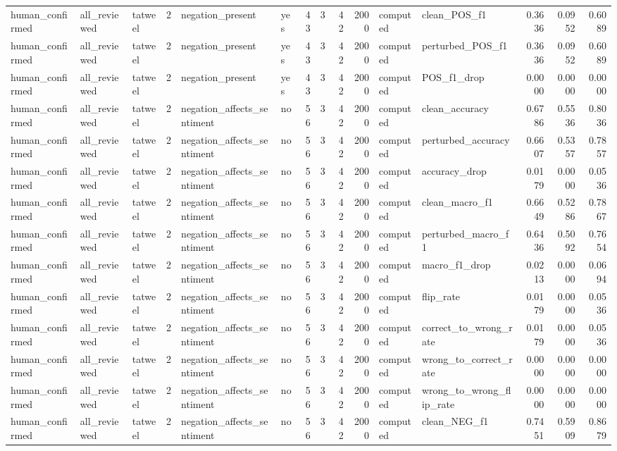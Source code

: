 \begin{tabular}{lllrllrrrrllrrr}
human_confirmed & all_reviewed & tatweel & 2 & negation_present & yes & 43 & 3 & 42 & 2000 & computed & clean_POS_f1 & 0.3636 & 0.0952 & 0.6089 \\
human_confirmed & all_reviewed & tatweel & 2 & negation_present & yes & 43 & 3 & 42 & 2000 & computed & perturbed_POS_f1 & 0.3636 & 0.0952 & 0.6089 \\
human_confirmed & all_reviewed & tatweel & 2 & negation_present & yes & 43 & 3 & 42 & 2000 & computed & POS_f1_drop & 0.0000 & 0.0000 & 0.0000 \\
human_confirmed & all_reviewed & tatweel & 2 & negation_affects_sentiment & no & 56 & 3 & 42 & 2000 & computed & clean_accuracy & 0.6786 & 0.5536 & 0.8036 \\
human_confirmed & all_reviewed & tatweel & 2 & negation_affects_sentiment & no & 56 & 3 & 42 & 2000 & computed & perturbed_accuracy & 0.6607 & 0.5357 & 0.7857 \\
human_confirmed & all_reviewed & tatweel & 2 & negation_affects_sentiment & no & 56 & 3 & 42 & 2000 & computed & accuracy_drop & 0.0179 & 0.0000 & 0.0536 \\
human_confirmed & all_reviewed & tatweel & 2 & negation_affects_sentiment & no & 56 & 3 & 42 & 2000 & computed & clean_macro_f1 & 0.6649 & 0.5286 & 0.7867 \\
human_confirmed & all_reviewed & tatweel & 2 & negation_affects_sentiment & no & 56 & 3 & 42 & 2000 & computed & perturbed_macro_f1 & 0.6436 & 0.5092 & 0.7654 \\
human_confirmed & all_reviewed & tatweel & 2 & negation_affects_sentiment & no & 56 & 3 & 42 & 2000 & computed & macro_f1_drop & 0.0213 & 0.0000 & 0.0694 \\
human_confirmed & all_reviewed & tatweel & 2 & negation_affects_sentiment & no & 56 & 3 & 42 & 2000 & computed & flip_rate & 0.0179 & 0.0000 & 0.0536 \\
human_confirmed & all_reviewed & tatweel & 2 & negation_affects_sentiment & no & 56 & 3 & 42 & 2000 & computed & correct_to_wrong_rate & 0.0179 & 0.0000 & 0.0536 \\
human_confirmed & all_reviewed & tatweel & 2 & negation_affects_sentiment & no & 56 & 3 & 42 & 2000 & computed & wrong_to_correct_rate & 0.0000 & 0.0000 & 0.0000 \\
human_confirmed & all_reviewed & tatweel & 2 & negation_affects_sentiment & no & 56 & 3 & 42 & 2000 & computed & wrong_to_wrong_flip_rate & 0.0000 & 0.0000 & 0.0000 \\
human_confirmed & all_reviewed & tatweel & 2 & negation_affects_sentiment & no & 56 & 3 & 42 & 2000 & computed & clean_NEG_f1 & 0.7451 & 0.5909 & 0.8679 \\

\end{tabular}
